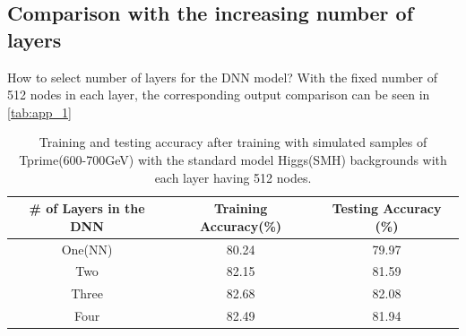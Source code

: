 \begin{appendices}
\chapter{\label{appendix}}
\end{appendices}

\section{Comparison with the increasing number of layers}
How to select number of layers for the DNN model? With the fixed number of 512 nodes in each layer, the corresponding output comparison can be seen in \autoref{tab:app_1}

\begin{table}[H]
    \centering
    \begin{tabular}{c|c|c} \hline
      \# of Layers in the DNN  & Training Accuracy(\%) &  Testing Accuracy (\%)  \\ \hline \hline
      
       One(NN)        &     80.24   &    79.97  \\
       Two      &  82.15 & 81.59    \\
        Three    & 82.68 & 82.08  \\
        Four &  82.49 & 81.94 \\\hline \hline
    \end{tabular}
    \caption{Training and testing accuracy after training with simulated samples of Tprime(600-700GeV) with the standard model Higgs(SMH) backgrounds with each layer having 512 nodes.}
    \label{tab:app_1}
\end{table}






